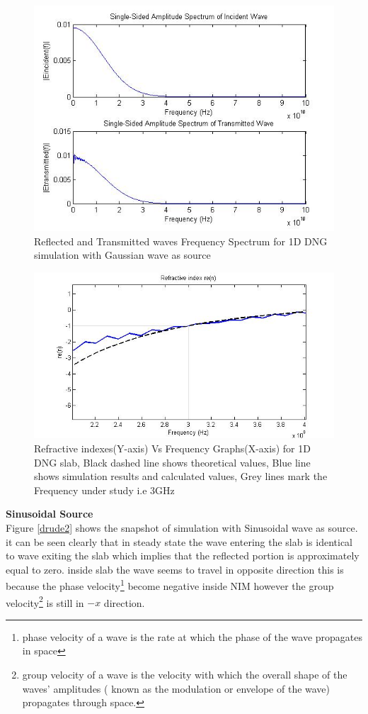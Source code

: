 \begin{figure}[H]
	\centering
		\includegraphics[width=5in]{Figures/drude5.jpg}
	\caption[Reflected and Transmitted wave's Frequency Spectrum for 1D DNG simulation]{Reflected and Transmitted waves Frequency Spectrum for 1D DNG simulation with Gaussian wave as source}
	\label{drude5}
\end{figure}
\begin{figure}[H]
	\centering
		\includegraphics[width=5in]{Figures/drude4.jpg}
	\caption[Refractive Index vs Frequency for 1D DNG slab]{Refractive indexes(Y-axis) Vs Frequency Graphs(X-axis) for 1D DNG slab, Black dashed line shows theoretical values, Blue line shows simulation results and calculated values, Grey lines mark the Frequency under study i.e 3GHz }
	\label{drude4}
\end{figure}
\textbf{Sinusoidal Source}\\
Figure \ref{drude2} shows the snapshot of simulation with Sinusoidal wave as source. it can be seen clearly that in steady state the wave entering the slab is identical to wave exiting the slab which implies that the reflected portion is approximately equal to zero. inside slab the wave seems to travel in opposite direction this is because the phase velocity\footnote{phase velocity of a wave is the rate at which the phase of the wave propagates in space} become negative inside NIM however the group velocity\footnote{group velocity of a wave is the velocity with which the overall shape of the waves' amplitudes ( known as the modulation or envelope of the wave) propagates through space.} is still in $-x$ direction.
